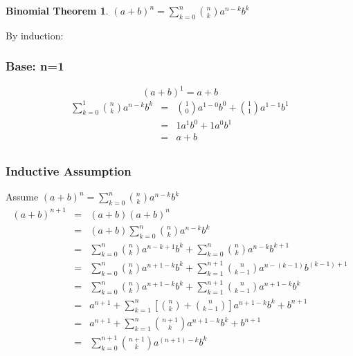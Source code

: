 \documentclass[letterpaper,12pt,fleqn]{article}
\begin{document}
\theoremstyle{mathitem}
\newtheorem*{binomial}{Binomial Theorem}
\begin{binomial}
$(a+b)^n=\sum_{k=0}^n\binom{n}{k}a^{n-k}b^k$
\end{binomial}
\begin{theproof}
By induction:
\subsubsection*{Base: n=1}
\[(a+b)^1=a+b\]
\begin{eqnarray*}
\sum_{k=0}^1\binom{n}{k}a^{n-k}b^k &=&
  \binom{1}{0}a^{1-0}b^0+\binom{1}{1}a^{1-1}b^1 \\
    &=& 1a^1b^0+1a^0b^1 \\
    &=& a+b \\
\end{eqnarray*}
\subsubsection*{Inductive Assumption}
Assume $(a+b)^n=\sum_{k=0}^n\binom{n}{k}a^{n-k}b^k$
\begin{eqnarray*}
(a+b)^{n+1} &=& (a+b)(a+b)^n \\
    &=& (a+b)\sum_{k=0}^n\binom{n}{k}a^{n-k}b^k \\
    &=& \sum_{k=0}^n\binom{n}{k}a^{n-k+1}b^k+\sum_{k=0}^n\binom{n}{k}a^{n-k}b^{k+1} \\
    &=& \sum_{k=0}^n\binom{n}{k}a^{n+1-k}b^k+
        \sum_{k=1}^{n+1}\binom{n}{k-1}a^{n-(k-1)}b^{(k-1)+1} \\
    &=& \sum_{k=0}^n\binom{n}{k}a^{n+1-k}b^k+
        \sum_{k=1}^{n+1}\binom{n}{k-1}a^{n+1-k}b^k \\
    &=& a^{n+1}+
        \sum_{k=1}^n\left[\binom{n}{k}+\binom{n}{k-1}\right]a^{n+1-k}b^k+
        b^{n+1} \\
    &=& a^{n+1}+\sum_{k=1}^n\binom{n+1}{k}a^{n+1-k}b^k+b^{n+1} \\
    &=& \sum_{k=0}^{n+1}\binom{n+1}{k}a^{(n+1)-k}b^k \\
\end{eqnarray*}
\end{theproof}
\end{document}
